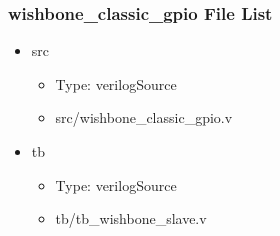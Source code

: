 \subsubsection{wishbone\_classic\_gpio File List}
\begin{itemize}
\item src
	\begin{itemize}
	\item[$\space$] Type: verilogSource
	\item src/wishbone\_classic\_gpio.v
	\end{itemize}
\item tb
	\begin{itemize}
	\item[$\space$] Type: verilogSource
	\item tb/tb\_wishbone\_slave.v
	\end{itemize}
\end{itemize}
